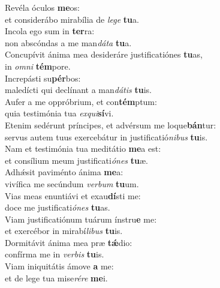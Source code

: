 \evenverse Revéla óculos \textbf{me}os:~\*\\
\evenverse et considerábo mirabília de \textit{le}\textit{ge} \textbf{tu}a.\\
\oddverse Incola ego sum in \textbf{ter}ra:~\*\\
\oddverse non abscóndas a me man\textit{dá}\textit{ta} \textbf{tu}a.\\
\evenverse Concupívit ánima mea desideráre justificatiónes \textbf{tu}as,~\*\\
\evenverse in \textit{om}\textit{ni} \textbf{tém}pore.\\
\oddverse Increpásti su\textbf{pér}bos:~\*\\
\oddverse maledícti qui declínant a man\textit{dá}\textit{tis} \textbf{tu}is.\\
\evenverse Aufer a me oppróbrium, et con\textbf{tém}ptum:~\*\\
\evenverse quia testimónia tua \textit{ex}\textit{qui}\textbf{sí}vi.\\
\oddverse Etenim sedérunt príncipes, et advérsum me loque\textbf{bán}tur:~\*\\
\oddverse servus autem tuus exercebátur in justificatió\textit{ni}\textit{bus} \textbf{tu}is.\\
\evenverse Nam et testimónia tua meditátio \textbf{me}a est:~\*\\
\evenverse et consílium meum justificati\textit{ó}\textit{nes} \textbf{tu}æ.\\
\oddverse Adhǽsit paviménto ánima \textbf{me}a:~\*\\
\oddverse vivífica me secúndum \textit{ver}\textit{bum} \textbf{tu}um.\\
\evenverse Vias meas enuntiávi et exau\textbf{dí}sti me:~\*\\
\evenverse doce me justificati\textit{ó}\textit{nes} \textbf{tu}as.\\
\oddverse Viam justificatiónum tuárum ínstru\textbf{e} me:~\*\\
\oddverse et exercébor in mirabí\textit{li}\textit{bus} \textbf{tu}is.\\
\evenverse Dormitávit ánima mea præ \textbf{tǽ}dio:~\*\\
\evenverse confírma me in \textit{ver}\textit{bis} \textbf{tu}is.\\
\oddverse Viam iniquitátis ámove \textbf{a} me:~\*\\
\oddverse et de lege tua mise\textit{ré}\textit{re} \textbf{me}i.\\
